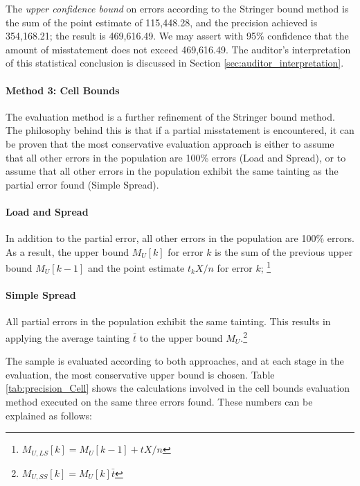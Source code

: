 The \emph{upper confidence bound} on errors according to the Stringer bound method is the sum of the point estimate of 115,448.28, and the precision achieved is 354,168.21; the result is 469,616.49. We may assert with 95\% confidence that the amount of misstatement does not exceed 469,616.49. The auditor's interpretation of this statistical conclusion is discussed in Section \ref{sec:auditor_interpretation}.

\paragraph{Method 3: Cell Bounds} The  evaluation method is a further refinement of the Stringer bound method. 
The philosophy behind this is that if a partial misstatement is encountered, it can be proven that the most conservative evaluation approach is either to assume that all other errors in the population are 100\% errors (Load and Spread), or to assume that all other errors in the population exhibit the same tainting as the partial error found (Simple Spread).

\paragraph{Load and Spread} In addition to the partial error, all other errors in the population are 100\% errors. As a result, the upper bound $M_U[k]$ for error $k$ is the sum of the previous upper bound $M_U[k-1]$ and the point estimate $t_k X / n$ for error $k$; \footnote{$M_{U,LS}[k] = M_U[k-1] + t X / n$}

\paragraph{Simple Spread} All partial errors in the population exhibit the same tainting. This results in applying the average tainting $\bar{t}$ to the upper bound $M_U$.\footnote{$M_{U,SS}[k] = M_U[k] \bar{t}$}

The sample is evaluated according to both approaches, and at each stage in the evaluation, the most conservative upper bound is chosen. Table \ref{tab:precision_Cell} shows the calculations involved in the cell bounds evaluation method executed on the same three errors found. These numbers can be explained as follows:


